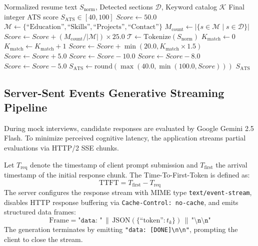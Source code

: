 \documentclass[conference]{IEEEtran}
\begin{document}
\begin{algorithm}[t]
\caption{Deterministic Multi-Factor ATS Resume Scoring}
\label{alg:ats}
\begin{algorithmic}[1]
\REQUIRE Normalized resume text $S_{\mathrm{norm}}$, Detected sections $\mathcal{D}$, Keyword catalog $\mathcal{K}$
\ENSURE Final integer ATS score $S_{\mathrm{ATS}} \in [40, 100]$
\STATE $Score \leftarrow 50.0$ 
\STATE $\mathcal{M} \leftarrow \{\text{``Education''}, \text{``Skills''}, \text{``Projects''}, \text{``Contact''}\}$
\STATE $M_{\mathrm{count}} \leftarrow |\{s \in \mathcal{M} \mid s \in \mathcal{D}\}|$
\STATE $Score \leftarrow Score + (M_{\mathrm{count}} / |\mathcal{M}|) \times 25.0$
\STATE $\mathcal{T} \leftarrow \mathrm{Tokenize}(S_{\mathrm{norm}})$
\STATE $K_{\mathrm{match}} \leftarrow 0$
        \STATE $K_{\mathrm{match}} \leftarrow K_{\mathrm{match}} + 1$
    \ENDIF
\ENDFOR
\STATE $Score \leftarrow Score + \min(20.0, K_{\mathrm{match}} \times 1.5)$
    \STATE $Score \leftarrow Score + 5.0$
    \STATE $Score \leftarrow Score - 10.0$
\ENDIF
{}
    \STATE $Score \leftarrow Score - 8.0$
\ENDIF
{}
    \STATE $Score \leftarrow Score - 5.0$
\ENDIF
\STATE $S_{\mathrm{ATS}} \leftarrow \mathrm{round}(\max(40.0, \min(100.0, Score)))$
\RETURN $S_{\mathrm{ATS}}$
\end{algorithmic}
\end{algorithm}

\subsection{Server-Sent Events Generative Streaming Pipeline}
During mock interviews, candidate responses are evaluated by Google Gemini 2.5 Flash. To minimize perceived cognitive latency, the application streams partial evaluations via HTTP/2 SSE chunks. 

Let $T_{\mathrm{req}}$ denote the timestamp of client prompt submission and $T_{\mathrm{first}}$ the arrival timestamp of the initial response chunk. The Time-To-First-Token is defined as:
\begin{equation}
    \mathrm{TTFT} = T_{\mathrm{first}} - T_{\mathrm{req}}
\end{equation}
The server configures the response stream with MIME type \texttt{text/event-stream}, disables HTTP response buffering via \texttt{Cache-Control: no-cache}, and emits structured data frames:
\begin{equation}
    \text{Frame} = \texttt{"data: "} \, \parallel \, \mathrm{JSON}(\{ \text{``token''}: t_k \}) \, \parallel \, \texttt{"\textbackslash n\textbackslash n"}
\end{equation}
The generation terminates by emitting \texttt{"data: [DONE]\textbackslash n\textbackslash n"}, prompting the client to close the stream.
\end{document}
